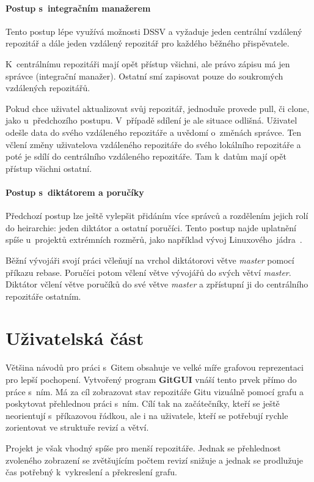 \documentclass[
  biblatex,
  glossaries,
  index
]{kidiplom}
\begin{document}
\paragraph*{Postup s~integračním manažerem}
Tento postup lépe využívá možnosti DSSV a vyžaduje jeden centrální vzdálený repozitář a dále jeden vzdálený repozitář pro každého běžného přispěvatele.

K~centrálnímu repozitáři mají opět přístup všichni, ale právo zápisu má jen správce (integrační manažer). Ostatní smí zapisovat pouze do soukromých vzdálených repozitářů.

Pokud chce uživatel aktualizovat svůj repozitář, jednoduše provede pull, či clone, jako u~předchozího postupu. V~případě sdílení je ale situace odlišná. Uživatel odešle data do svého vzdáleného repozitáře a uvědomí o~změnách správce. Ten včlení změny uživatelova vzdáleného repozitáře do svého lokálního repozitáře a poté je sdílí do centrálního vzdáleného repozitáře. Tam k~datům mají opět přístup všichni ostatní.

\paragraph*{Postup s~diktátorem a poručíky}
Předchozí postup lze ještě vylepšit přidáním více správců a rozdělením jejich rolí do heirarchie: jeden diktátor a ostatní poručíci. Tento postup najde uplatnění spíše u~projektů extrémních rozměrů, jako například vývoj Linuxového~jádra~\cite{linux}.

Běžní vývojáři svojí práci včleňují na vrchol diktátorovi větve {\it master} pomocí příkazu rebase. Poručíci potom včlení větve vývojářů do svých větví {\it master}. Diktátor včlení větve poručíků do své větve {\it master} a zpřístupní ji do centrálního repozitáře ostatním.

\section{Uživatelská část}
Většina návodů pro práci s~Gitem obsahuje ve velké míře grafovou reprezentaci pro lepší pochopení. Vytvořený program \textbf{GitGUI} vnáší tento prvek přímo do práce s~ním. Má za cíl zobrazovat stav repozitáře Gitu vizuálně pomocí grafu a poskytovat přehlednou práci s~ním. Cílí tak na začátečníky, kteří se ještě neorientují s~příkazovou řádkou, ale i na uživatele, kteří se potřebují rychle zorientovat ve struktuře revizí a větví.

Projekt je však vhodný spíše pro menší repozitáře. Jednak se přehlednost zvoleného zobrazení se zvětšujícím počtem revizí snižuje a jednak se prodlužuje čas potřebný k~vykreslení a překreslení grafu.
\end{document}
